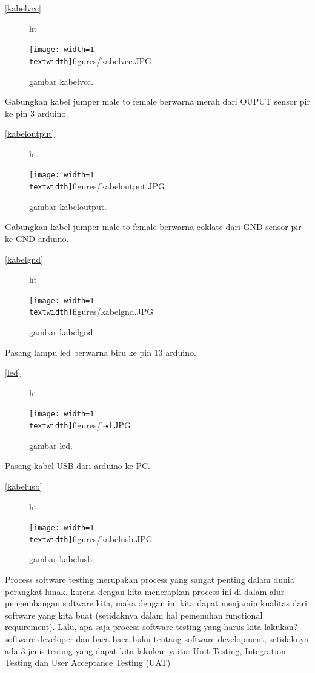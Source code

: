 \documentclass{article}
\begin{document}
\ref{kabelvcc}

\begin{figure} {ht}
\centerline{\texttt{[image: width=1\\textwidth]}{figures/kabelvcc.JPG}}
\caption{gambar kabelvcc.}
\label{kabelvcc.JPG}
\end{figure}


Gabungkan kabel jumper male to female berwarna merah dari OUPUT sensor pir ke pin 3 arduino.

\ref{kabeloutput}
\begin{figure} {ht}
\centerline{\texttt{[image: width=1\\textwidth]}{figures/kabeloutput.JPG}}
\caption{gambar kabeloutput.}
\label{kabeloutput.JPG}
\end{figure}


Gabungkan kabel jumper male to female berwarna coklate dari GND sensor pir ke GND arduino.

\ref{kabelgnd}
\begin{figure} {ht}
\centerline{\texttt{[image: width=1\\textwidth]}{figures/kabelgnd.JPG}}
\caption{gambar kabelgnd.}
\label{kabelgnd.JPG}
\end{figure}


Pasang lampu led berwarna biru ke pin 13 arduino.

\ref{led}
\begin{figure} {ht}
\centerline{\texttt{[image: width=1\\textwidth]}{figures/led.JPG}}
\caption{gambar led.}
\label{led.JPG}
\end{figure}


Pasang kabel USB dari arduino ke PC.

\ref{kabelusb}
\begin{figure} {ht}
\centerline{\texttt{[image: width=1\\textwidth]}{figures/kabelusb.JPG}}
\caption{gambar kabelusb.}
\label{kabelusb.JPG}
\end{figure}


Process software testing merupakan process yang sangat penting dalam dunia perangkat lunak. karena dengan kita menerapkan process ini di dalam alur pengembangan software kita, maka dengan ini kita dapat menjamin kualitas dari software yang kita buat (setidaknya dalam hal pemenuhan functional requirement). Lalu, apa saja process software testing yang harus kita lakukan? software developer dan baca-baca buku tentang software development, setidaknya ada 3 jenis testing yang dapat kita lakukan yaitu: Unit Testing, Integration Testing dan User Acceptance Testing (UAT)
\end{document}
